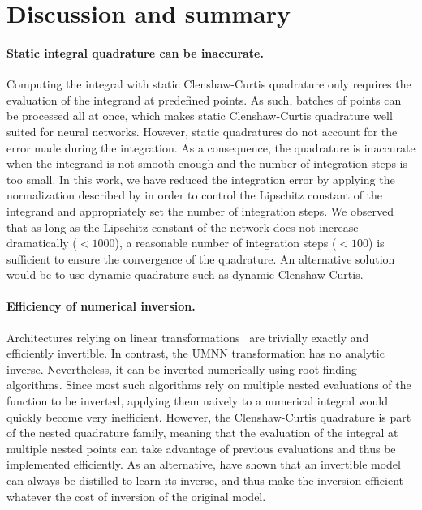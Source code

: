 
\section{Discussion and summary}

\paragraph{Static integral quadrature can be inaccurate.}
Computing the integral with static Clenshaw-Curtis quadrature only requires the evaluation of the integrand at predefined points. As such, batches of points can be processed all at once, which makes static Clenshaw-Curtis quadrature well suited for neural networks. However, static quadratures do not account for the error made during the integration. As a consequence, the quadrature is inaccurate when the integrand is not smooth enough and the number of integration steps is too small. In this work, we have reduced the integration error by applying the normalization described by \cite{L_regularisation} in order to control the Lipschitz constant of the integrand and appropriately set the number of integration steps. We observed that as long as the Lipschitz constant of the network does not increase dramatically ($<1000$), a reasonable number of integration steps ($<100$) is sufficient to ensure the convergence of the quadrature. An alternative solution would be to use dynamic quadrature such as dynamic Clenshaw-Curtis.

\paragraph{Efficiency of numerical inversion.}
Architectures relying on linear transformations~\citep{papamakarios_masked_2017, kingma_improved_2016,  dinh_density_2017, kingma_glow_2018} are trivially exactly and efficiently invertible. In contrast, the UMNN transformation has no analytic inverse.
Nevertheless, it can be inverted numerically using root-finding algorithms.
Since most such algorithms rely on multiple nested evaluations of the function to be inverted, applying them naively to a numerical integral would quickly become very inefficient. However, the Clenshaw-Curtis quadrature is part of the nested quadrature family, meaning that the evaluation of the integral at multiple nested points can take advantage of previous evaluations and thus be implemented efficiently.
As an alternative, \cite{van_den_oord_parallel_2018} have shown that an invertible model can always be distilled to learn its inverse, and thus make the inversion efficient whatever the cost of inversion of the original model.

